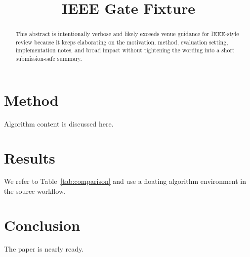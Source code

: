 \documentclass{article}
\title{IEEE Gate Fixture}
\begin{document}
\begin{abstract}
This abstract is intentionally verbose and likely exceeds venue guidance for IEEE-style review because it keeps elaborating on the motivation, method, evaluation setting, implementation notes, and broad impact without tightening the wording into a short submission-safe summary.
\end{abstract}
\section{Method}
Algorithm content is discussed here.
\section{Results}
We refer to Table~\ref{tab:comparison} and use a floating algorithm environment in the source workflow.
\section{Conclusion}
The paper is nearly ready.
\end{document}
